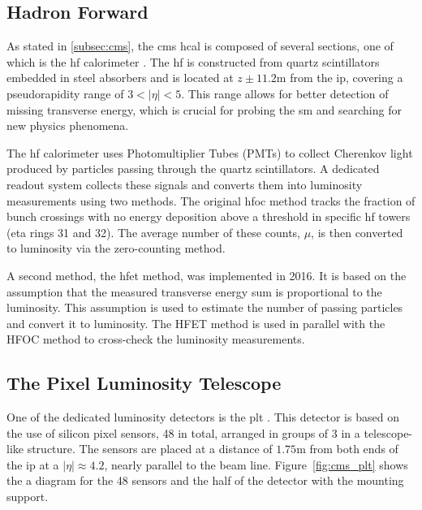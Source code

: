 \subsection{Hadron Forward}

As stated in \autoref{subsec:cms}, the \acrshort{cms} \acrshort{hcal} is composed of several sections, one of which is the \acrfull{hf} calorimeter \cite{CMS:2012tda}. The \acrshort{hf} is constructed from quartz scintillators embedded in steel absorbers and is located at $z \pm 11.2$m from the \acrshort{ip}, covering a pseudorapidity range of $3 < |\eta| < 5$. This range allows for better detection of missing transverse energy, which is crucial for probing the \acrshort{sm} and searching for new physics phenomena.

The \acrshort{hf} calorimeter uses Photomultiplier Tubes (PMTs) to collect Cherenkov light produced by particles passing through the quartz scintillators. A dedicated readout system collects these signals and converts them into luminosity measurements using two methods. The original \acrshort{hfoc} method tracks the fraction of bunch crossings with no energy deposition above a threshold in specific \acrshort{hf} towers (eta rings 31 and 32). The average number of these counts, $\mu$, is then converted to luminosity via the zero-counting method.

A second method, the \acrshort{hfet} method, was implemented in 2016. It is based on the assumption that the measured transverse energy sum is proportional to the luminosity. This assumption is used to estimate the number of passing particles and convert it to luminosity. The HFET method is used in parallel with the HFOC method to cross-check the luminosity measurements.

\subsection{The Pixel Luminosity Telescope}
\label{subsubsec:plt}

One of the dedicated luminosity detectors is the \acrfull{plt} \cite{CMS-DP-2021-020}. This detector is based on the use of silicon pixel sensors, 48 in total, arranged in groups of 3 in a telescope-like structure. The sensors are placed at a distance of $1.75$m from both ends of the \acrshort{ip} at a $|\eta| \approx 4.2$, nearly parallel to the beam line. Figure~\ref{fig:cms_plt} shows the a diagram for the 48 sensors and the half of the detector with the mounting support.

